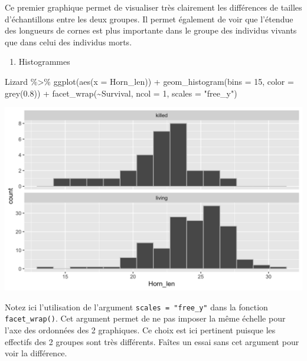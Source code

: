 \documentclass[
  a4paper,
]{article}
\newenvironment{Shaded}{\begin{snugshade}}{\end{snugshade}}
\newcommand{\AttributeTok}[1]{\textcolor[rgb]{0.00,0.34,0.68}{#1}}
\newcommand{\DecValTok}[1]{\textcolor[rgb]{0.69,0.50,0.00}{#1}}
\newcommand{\FloatTok}[1]{\textcolor[rgb]{0.69,0.50,0.00}{#1}}
\newcommand{\FunctionTok}[1]{\textcolor[rgb]{0.39,0.29,0.61}{#1}}
\newcommand{\NormalTok}[1]{\textcolor[rgb]{0.12,0.11,0.11}{#1}}
\newcommand{\SpecialCharTok}[1]{\textcolor[rgb]{0.24,0.68,0.91}{#1}}
\newcommand{\StringTok}[1]{\textcolor[rgb]{0.75,0.01,0.01}{#1}}
\providecommand{\tightlist}{%
  \setlength{\itemsep}{0pt}\setlength{\parskip}{0pt}}
\begin{document}
Ce premier graphique permet de visualiser très clairement les différences de tailles d'échantillons entre les deux groupes. Il permet également de voir que l'étendue des longueurs de cornes est plus importante dans le groupe des individus vivants que dans celui des individus morts.

\begin{enumerate}
\def\labelenumi{\arabic{enumi}.}
\setcounter{enumi}{1}
\tightlist
\item
  Histogrammes
\end{enumerate}

\begin{Shaded}
\begin{Highlighting}[]
\NormalTok{Lizard }\SpecialCharTok{\%\textgreater{}\%} 
  \FunctionTok{ggplot}\NormalTok{(}\FunctionTok{aes}\NormalTok{(}\AttributeTok{x =}\NormalTok{ Horn\_len)) }\SpecialCharTok{+}
  \FunctionTok{geom\_histogram}\NormalTok{(}\AttributeTok{bins =} \DecValTok{15}\NormalTok{, }\AttributeTok{color =} \FunctionTok{grey}\NormalTok{(}\FloatTok{0.8}\NormalTok{)) }\SpecialCharTok{+}
  \FunctionTok{facet\_wrap}\NormalTok{(}\SpecialCharTok{\textasciitilde{}}\NormalTok{Survival, }\AttributeTok{ncol =} \DecValTok{1}\NormalTok{, }\AttributeTok{scales =} \StringTok{"free\_y"}\NormalTok{)}
\end{Highlighting}
\end{Shaded}

\begin{center}\includegraphics[width=0.9\linewidth]{figure/unnamed-chunk-51-1} \end{center}

Notez ici l'utilisation de l'argument \texttt{scales\ =\ "free\_y"} dans la fonction \texttt{facet\_wrap()}. Cet argument permet de ne pas imposer la même échelle pour l'axe des ordonnées des 2 graphiques. Ce choix est ici pertinent puisque les effectifs des 2 groupes sont très différents. Faîtes un essai sans cet argument pour voir la différence.
\end{document}
